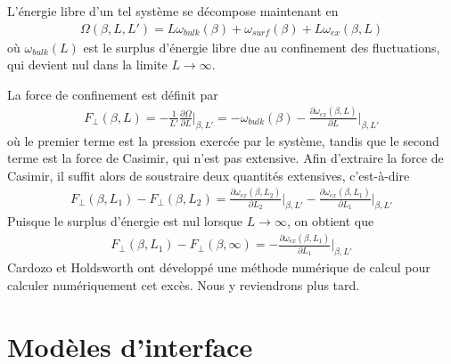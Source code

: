 L'énergie libre d'un tel système se décompose maintenant en 
\begin{align}
    \Omega(\beta,L,L') = L \omega_{bulk}(\beta) + \omega_{surf}(\beta) + L \omega_{ex}(\beta,L)
    \label{decomposition-energie}
\end{align}
où $\omega_{bulk}(L)$ est le surplus d'énergie libre due au confinement des fluctuations, qui devient nul dans la limite $L\to \infty$.

La force de confinement est définit par 
\begin{align}
    F_\perp(\beta,L) = - \frac{1}{L' }\frac{\partial \Omega}{\partial L} \bigg|_{\beta,L'} = -  \omega_{bulk}(\beta) -  \frac{\partial \omega_{ex}(\beta,L)}{\partial L}\bigg|_{\beta,L'}
\end{align}
où le premier terme est la pression exercée par le système, tandis que le second terme est la force de Casimir, qui n'est pas extensive. Afin d'extraire la force de Casimir, il suffit alors de soustraire deux quantités extensives, c'est-à-dire 
\begin{align}
    F_\perp(\beta,L_1) - F_\perp(\beta,L_2) =   \frac{\partial \omega_{ex}(\beta,L_2)}{\partial L_2}\bigg|_{\beta,L'} -  \frac{\partial \omega_{ex}(\beta,L_1)}{\partial L_1}\bigg|_{\beta,L'}
\end{align}
Puisque le surplus d'énergie est nul lorsque $L\to \infty$, on obtient que
\begin{align}
    F_\perp(\beta,L_1) - F_\perp(\beta,\infty) =   -  \frac{\partial \omega_{ex}(\beta,L_1)}{\partial L_1}\bigg|_{\beta,L'}
\end{align}
Cardozo et Holdsworth\cite[§5]{cardozo_finite_2015} ont développé une méthode numérique de calcul pour calculer numériquement cet excès. Nous y reviendrons plus tard.




    \section{Modèles d'interface}

